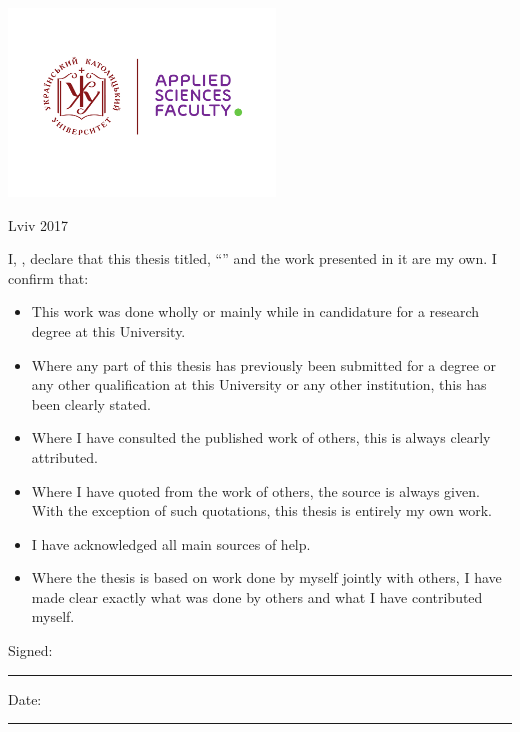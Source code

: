 \documentclass[
12pt, %
oneside, %
english, %
onehalfspacing, %
nolistspacing, %
liststotoc, %
parskip, %
headsepline, %
]{MastersDoctoralThesis} %
\begin{document}
\begin{titlepage}
\begin{center}
\vfill
\includegraphics[height=5cm]{UCU-Apps.png} %

\vfill
{\large Lviv 2017}\\[4cm] %
 
\vfill
\end{center}
\end{titlepage}


\begin{declaration}
\addchaptertocentry{\authorshipname} %
\noindent I, \authorname, declare that this thesis titled, \enquote{\ttitle} and the work presented in it are my own. I confirm that:

\begin{itemize} 
\item This work was done wholly or mainly while in candidature for a research degree at this University.
\item Where any part of this thesis has previously been submitted for a degree or any other qualification at this University or any other institution, this has been clearly stated.
\item Where I have consulted the published work of others, this is always clearly attributed.
\item Where I have quoted from the work of others, the source is always given. With the exception of such quotations, this thesis is entirely my own work.
\item I have acknowledged all main sources of help.
\item Where the thesis is based on work done by myself jointly with others, I have made clear exactly what was done by others and what I have contributed myself.\\
\end{itemize}
 
\noindent Signed:\\
\rule[0.5em]{25em}{0.5pt} %
 
\noindent Date:\\
\rule[0.5em]{25em}{0.5pt} %
\end{declaration}
\end{document}
